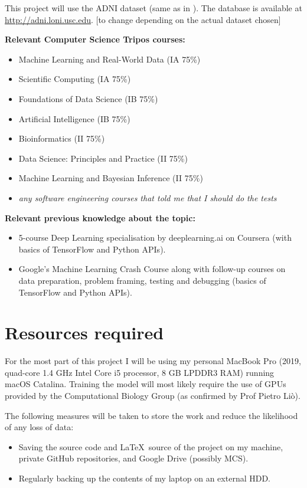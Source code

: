 \documentclass[12pt,a4paper,twoside]{article}
\begin{document}
This project will use the ADNI dataset (same as in \cite{parisot2017spectral,parisot2018disease}). The database is available at \url{http://adni.loni.usc.edu}. [to change depending on the actual dataset chosen]

\textbf{Relevant Computer Science Tripos courses:}
\begin{itemize}
  \item Machine Learning and Real-World Data (IA 75\%)
  \item Scientific Computing (IA 75\%)
  \item Foundations of Data Science (IB 75\%)
  \item Artificial Intelligence (IB 75\%)
  \item Bioinformatics (II 75\%)
  \item Data Science: Principles and Practice (II 75\%)
  \item Machine Learning and Bayesian Inference (II 75\%)
  \item \textit{any software engineering courses that told me that I should do the tests}
\end{itemize}

\textbf{Relevant previous knowledge about the topic:}
\begin{itemize}
  \item 5-course Deep Learning specialisation by deeplearning.ai on Coursera (with basics of TensorFlow and Python APIs).
  \item Google's Machine Learning Crash Course along with follow-up courses on data preparation, problem framing, testing and debugging (basics of TensorFlow and Python APIs).
\end{itemize}

\section*{Resources required}

For the most part of this project I will be using my personal MacBook Pro (2019, quad-core 1.4 GHz Intel Core i5 processor, 8 GB LPDDR3 RAM) running macOS Catalina. Training the model will most likely require the use of GPUs provided by the Computational Biology Group (as confirmed by Prof Pietro Liò).

The following measures will be taken to store the work and reduce the likelihood of any loss of data: 
\begin{itemize}
  \item Saving the source code and \LaTeX\ source of the project on my machine, private GitHub repositories, and Google Drive (possibly MCS).
  \item Regularly backing up the contents of my laptop on an external HDD.
\end{itemize}
\end{document}
